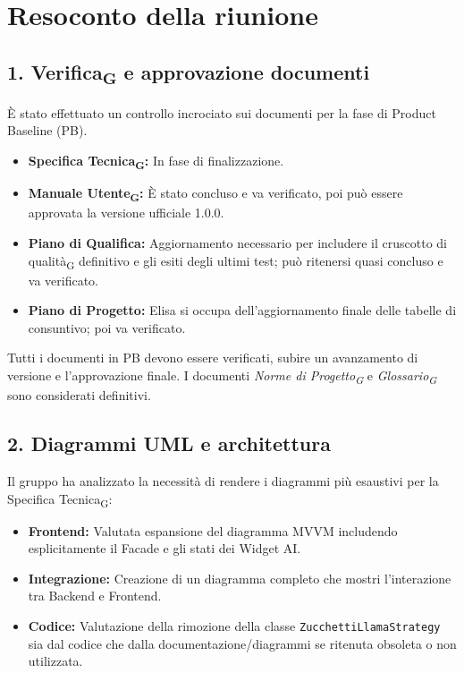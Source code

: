 \documentclass[a4paper,12pt]{article}
\newcommand{\gls}[1]{#1\textsubscript{G}}
\begin{document}
\section*{Resoconto della riunione}

\subsection*{1. \gls{Verifica} e approvazione documenti}
È stato effettuato un controllo incrociato sui documenti per la fase di Product Baseline (PB).
\begin{itemize}
    \item \textbf{\gls{Specifica Tecnica}:} In fase di finalizzazione.
    \item \textbf{\gls{Manuale Utente}:} È stato concluso e va verificato, poi può essere approvata la versione ufficiale 1.0.0.
    \item \textbf{Piano di Qualifica:} Aggiornamento necessario per includere il \gls{cruscotto di qualità} definitivo e gli esiti degli ultimi test; può ritenersi quasi concluso e va verificato.
    \item \textbf{Piano di Progetto:} Elisa si occupa dell'aggiornamento finale delle tabelle di consuntivo; poi va verificato.
\end{itemize}
Tutti i documenti in PB devono essere verificati, subire un avanzamento di versione e l'approvazione finale. I documenti \textit{\gls{Norme di Progetto}} e \textit{\gls{Glossario}} sono considerati definitivi.

\subsection*{2. Diagrammi UML e architettura}
Il gruppo ha analizzato la necessità di rendere i diagrammi più esaustivi per la \gls{Specifica Tecnica}:
\begin{itemize}
    \item \textbf{Frontend:} Valutata espansione del diagramma MVVM includendo esplicitamente il Facade e gli stati dei Widget AI.
    \item \textbf{Integrazione:} Creazione di un diagramma completo che mostri l'interazione tra Backend e Frontend.
    \item \textbf{Codice:} Valutazione della rimozione della classe \texttt{ZucchettiLlamaStrategy} sia dal codice che dalla documentazione/diagrammi se ritenuta obsoleta o non utilizzata.
\end{itemize}
\end{document}
